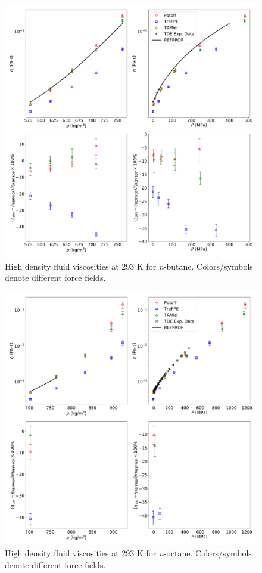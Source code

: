\documentclass[preprint,review,12pt]{elsarticle}
\begin{document}
\begin{figure}[p!]
	\centering
	\includegraphics[width=6.4in]{compare_REFPROP_T293highP_C4H10_Pas_new_REFPROP.pdf}
	\caption{High density fluid viscosities at 293 K for \textit{n}-butane. Colors/symbols denote different force fields.}
	\label{fig:T293highP_C4}
\end{figure} 

\begin{figure}[p!]
	\centering
	\includegraphics[width=6.4in]{compare_REFPROP_T293highP_C8H18_all.pdf}
	\caption{High density fluid viscosities at 293 K for \textit{n}-octane. Colors/symbols denote different force fields.}
	\label{fig:T293highP_C8}
\end{figure} 
\end{document}
